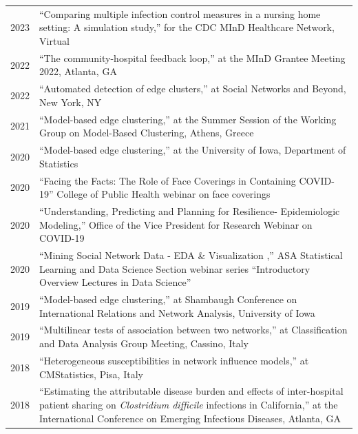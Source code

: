 \documentclass[11pt]{article}
\begin{document}
\begin{longtable}{r|p{15.5cm}}
2023 & ``Comparing multiple infection control 
measures in a nursing home setting: 
A simulation study,'' for the CDC MInD Healthcare Network, Virtual \\
2022 & ``The community-hospital feedback loop,'' at the MInD Grantee Meeting 2022, Atlanta, GA \\
2022 & ``Automated detection of edge clusters,'' at Social Networks and Beyond, New York, NY \\
2021 & ``Model-based edge clustering,'' at the Summer Session of the Working Group on Model-Based Clustering, Athens, Greece \\
2020 & ``Model-based edge clustering,'' at the University of Iowa, Department of Statistics \\
2020 & ``Facing the Facts: The Role of Face Coverings in Containing COVID-19'' College of Public Health webinar on face coverings \\
2020 & ``Understanding, Predicting and Planning for Resilience- Epidemiologic Modeling,'' Office of the Vice President for Research Webinar on COVID-19 \\ 
2020 & ``Mining Social Network Data - EDA \& Visualization ,'' ASA Statistical Learning and Data Science Section webinar series ``Introductory Overview Lectures in Data Science'' \\ %
2019 & ``Model-based edge clustering,'' at Shambaugh Conference on International Relations and Network Analysis, University of Iowa \\ %
2019 & ``Multilinear tests of association between two networks,'' at Classification and Data Analysis Group Meeting, Cassino, Italy \\ %
2018 & ``Heterogeneous susceptibilities in network influence models,'' at CMStatistics, Pisa, Italy\\
2018 & ``Estimating the attributable disease burden and effects of inter-hospital patient sharing on {\it Clostridium difficile} infections in California,'' at the International Conference on Emerging Infectious Diseases, Atlanta, GA\\

\end{longtable}
\end{document}
